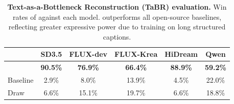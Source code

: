 \begin{table}
{\footnotesize
\setlength{\tabcolsep}{5pt}
  \centering
  \begin{tabular}{lccccc}
    \toprule
    & \textbf{SD3.5} & \textbf{FLUX-dev} & \textbf{FLUX-Krea} & \textbf{HiDream} & \textbf{Qwen} \\    
    \midrule
    \modelname{} & \textbf{90.5\%} & \textbf{76.9\%} & \textbf{66.4\%} & \textbf{88.9\%} & \textbf{59.2\%} \\
    Baseline & 2.9\% & 8.0\% & 13.9\% & 4.5\% & 22.0\% \\
    Draw & 6.6\% & 15.1\% & 19.7\% & 6.6\% & 18.8\% \\
    \bottomrule
  \end{tabular}
  }
\caption{\textbf{Text-as-a-Bottleneck Reconstruction (TaBR) evaluation.} Win rates of \modelname{} against each model. \modelname{} outperforms all open-source baselines, reflecting greater expressive power due to training on long structured captions.}

  \label{tab:tabr-comparison}

\end{table}




